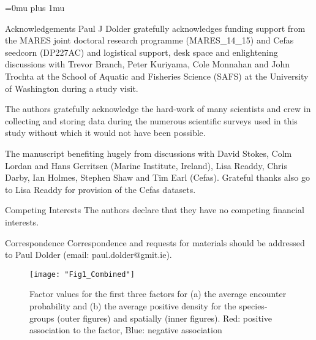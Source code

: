 \documentclass{nature}
\begin{document}
\newpage
\Urlmuskip=0mu plus 1mu\relax

\small{}


\newpage


\begin{addendum}
 \item [Acknowledgements] Paul J Dolder gratefully acknowledges funding support
	 from the MARES joint doctoral research programme (MARES\_14\_15) and
	 Cefas seedcorn (DP227AC) and logistical support, desk space and
	 enlightening discussions with Trevor Branch, Peter Kuriyama, Cole
	 Monnahan  and John Trochta at the School of Aquatic and Fisheries
	 Science (SAFS) at the University of Washington during a study visit.
	 
	 The authors gratefully acknowledge the hard-work of many scientists
	 and crew in collecting and storing data during the numerous scientific
	 surveys used in this study without which it would not have been
	 possible.  
	 
	 The manuscript benefiting hugely from discussions with David Stokes,
	 Colm Lordan and Hans Gerritsen (Marine Institute, Ireland), Lisa
	 Readdy, Chris Darby, Ian Holmes, Stephen Shaw and Tim Earl (Cefas).
	 Grateful thanks also go to Lisa Readdy for provision of the Cefas
	 datasets.

 \item[Competing Interests] The authors declare that they have
	 no competing financial interests.
 \item[Correspondence] Correspondence and requests for materials
 should be addressed to Paul Dolder (email: paul.dolder@gmit.ie).
 \end{addendum}



\begin{figure}
\begin{center}
	\texttt{[image: "Fig1\_Combined"]}
	\label{fig:1}
	\caption{Factor values for the first three factors for (a) the
		average encounter probability and (b) the average positive
		density for the species-groups (outer figures) and spatially
		(inner figures).  Red: positive association to the factor,
		Blue: negative association}
\end{center}
\end{figure}
\end{document}
